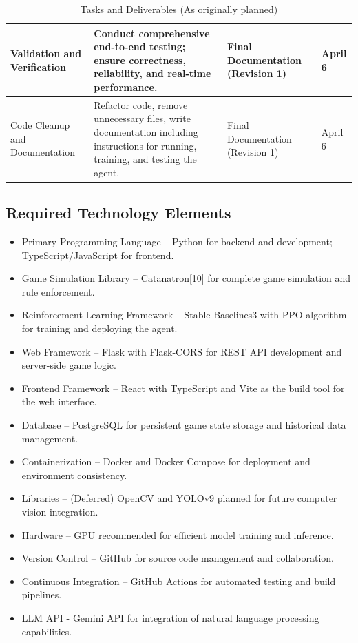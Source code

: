 \documentclass{article}
\begin{document}
\begin{table}[htbp]
\begin{tabular}{|p{3cm}|p{5cm}|p{3cm}|p{2cm}|}
Validation and Verification & Conduct comprehensive end-to-end testing; ensure correctness, reliability, and real-time performance. & Final Documentation (Revision 1) & April 6 \\ \hline

Code Cleanup and Documentation & Refactor code, remove unnecessary files, write documentation including instructions for running, training, and testing the agent. & Final Documentation (Revision 1) & April 6 \\ \hline

\end{tabular}
\caption{Tasks and Deliverables (As originally planned)}
\label{tab:tasks-deliverables}
\end{table}

\FloatBarrier


\subsection{Required Technology Elements}\label{subsec:requiredtech}
\begin{itemize}
    \item {Primary Programming Language} – Python for backend and \AI{} development; TypeScript/JavaScript for frontend.
    \item {Game Simulation Library} – Catanatron[10] for complete \emph{\Catan{}} game simulation and rule enforcement.
    \item {Reinforcement Learning Framework} – Stable Baselines3 with PPO algorithm for training and deploying the \AI{} agent.
    \item {Web Framework} – Flask with Flask-CORS for REST API development and server-side game logic.
    \item {Frontend Framework} – React with TypeScript and Vite as the build tool for the web interface.
    \item {Database} – PostgreSQL for persistent game state storage and historical data management.
    \item {Containerization} – Docker and Docker Compose for deployment and environment consistency.
    \item {\CV{} Libraries} – (Deferred) OpenCV and YOLOv9 planned for future computer vision integration.
    \item {Hardware} – GPU recommended for efficient \RL{} model training and inference.
    \item {Version Control} – GitHub for source code management and collaboration.
    \item {Continuous Integration} – GitHub Actions for automated testing and build pipelines.
    \item {LLM API} - Gemini API for integration of natural language processing capabilities.
\end{itemize}
\end{document}
